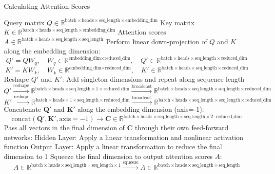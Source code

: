 \documentclass{article}
\begin{document}
\begin{algorithm}[H]
\caption{Calculating Attention Scores}
\label{alg:neural_attention}
\begin{algorithmic}[1]
\Require Query matrix $Q \in \mathbb{R}^{\text{batch} \times \text{heads} \times \text{seq\_length} \times \text{embedding\_dim}}$
\Require Key matrix $K \in \mathbb{R}^{\text{batch} \times \text{heads} \times \text{seq\_length} \times 
\text{embedding\_dim}}$
\Ensure Attention scores $A \in \mathbb{R}^{\text{batch} \times \text{heads} \times \text{seq\_length} \times \text{seq\_length}}$
\State Perform linear down-projection of $Q$ and $K$ along the embedding dimension:
    \[
    Q' = Q W_q, \quad W_q \in \mathbb{R}^{\text{embedding\_dim} \times \text{reduced\_dim}}, \quad Q' \in \mathbb{R}^{\text{batch} \times \text{heads} \times \text{seq\_length} \times \text{reduced\_dim}}
    \]
    \[
    K' = K W_k, \quad W_k \in \mathbb{R}^{\text{embedding\_dim} \times \text{reduced\_dim}}, \quad K' \in \mathbb{R}^{\text{batch} \times \text{heads} \times \text{seq\_length} \times \text{reduced\_dim}}
    \]
\State Reshape $Q'$ and $K'$: Add singleton dimensions and repeat along sequence length
    \[
        Q' \xrightarrow{\text{reshape}} \mathbb{R}^{\text{batch} \times \text{heads} \times \text{seq\_length} \times 1 \times \text{reduced\_dim}}
        \xrightarrow{\text{broadcast}} \mathbb{R}^{\text{batch} \times \text{heads} \times \text{seq\_length} \times \text{seq\_length} \times \text{reduced\_dim}}
    \]
    \[
        K' \xrightarrow{\text{reshape}} \mathbb{R}^{\text{batch} \times \text{heads} \times 1 \times \text{seq\_length} \times \text{reduced\_dim}}
        \xrightarrow{\text{broadcast}} \mathbb{R}^{\text{batch} \times \text{heads} \times \text{seq\_length} \times \text{seq\_length} \times \text{reduced\_dim}}
    \]
\State Concatenate $\mathbf{Q'}$ and $\mathbf{K'}$ along the embedding dimension (axis=-1):
    \[
    \text{concat}(\mathbf{Q'}, \mathbf{K'}, \text{axis}=-1) \rightarrow \mathbf{C} \in \mathbb{R}^{\text{batch} \times \text{heads} \times \text{seq\_length} \times \text{seq\_length} \times 2 \cdot \text{reduced\_dim}}
    \]
\State Pass all vectors in the final dimension of $\mathbf{C}$ through their own feed-forward networks:
   \Statex \hspace{1em} Hidden Layer: Apply a linear transformation and nonlinear activation function
    \Statex \hspace{1em} Output Layer: Apply a linear transformation to reduce the final dimension to 1
\State Squeeze the final dimension to output attention scores $A$: 
    \[
        A \in \mathbb{R}^{\text{batch} \times \text{heads} \times \text{seq\_length} \times \text{seq\_length} \times \text{1}}\xrightarrow{\text{squeeze}} A \in \mathbb{R}^{\text{batch} \times \text{heads} \times \text{seq\_length} \times \text{seq\_length}}
    \]
\end{algorithmic}
\end{algorithm}
\end{document}
